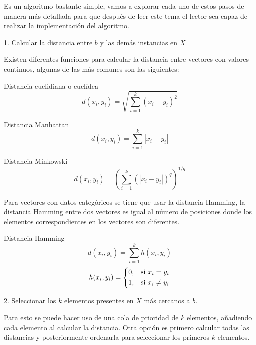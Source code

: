 \documentclass[11pt,fleqn]{book} %
\begin{document}
Es un algoritmo bastante simple, vamos a explorar cada uno de estos pasos de manera más detallada para que después de leer este tema el lector sea capaz de realizar la implementación del algoritmo.

\underline{1. Calcular la distancia entre $b$ y las demás instancias en $X$}

Existen diferentes funciones para calcular la distancia entre vectores con valores continuos, algunas de las más comunes son las siguientes:

Distancia euclidiana o euclídea
\begin{equation}
\label{eqn:distancia_euclidiana}
d(x_i,y_i) = \sqrt{\sum_{i=1}^{k}\left (  x_i - y_i \right )^{2}}
\end{equation}

Distancia Manhattan
\begin{equation}
\label{eqn:distancia_manhattan}
d(x_i,y_i) = \sum_{i=1}^{k}  \left | x_i - y_i  \right |
\end{equation}

Distancia Minkowski
\begin{equation}
\label{eqn:distancia_Minkowski}
d(x_i,y_i) = \left ( \sum_{i=1}^{k}  \left ( \left | x_i - y_i  \right | \right )^q \right )^{1/q}
\end{equation}

Para vectores con datos categóricos se tiene que usar la distancia Hamming, la distancia Hamming entre dos vectores es igual al número de posiciones donde los elementos correspondientes en los vectores son diferentes.

Distancia Hamming
\begin{equation}
\label{eqn:distancia_Hamming}
d(x_i,y_i) = \sum_{i=1}^{k} h(x_i,y_i)
\end{equation}
\begin{equation}
    h(x_i,y_i)= 
\begin{dcases}
    0,& \text{si } x_i = y_i\\
    1,& \text{si } x_i \neq  y_i
\end{dcases} 
\end{equation}

\underline{2. Seleccionar los $k$ elementos presentes en $X$ más cercanos a $b$.}

Para esto se puede hacer uso de una cola de prioridad de $k$ elementos, añadiendo cada elemento al calcular la distancia. Otra opción es primero calcular todas las distancias y posteriormente ordenarla para seleccionar los primeros $k$ elementos.
\end{document}
